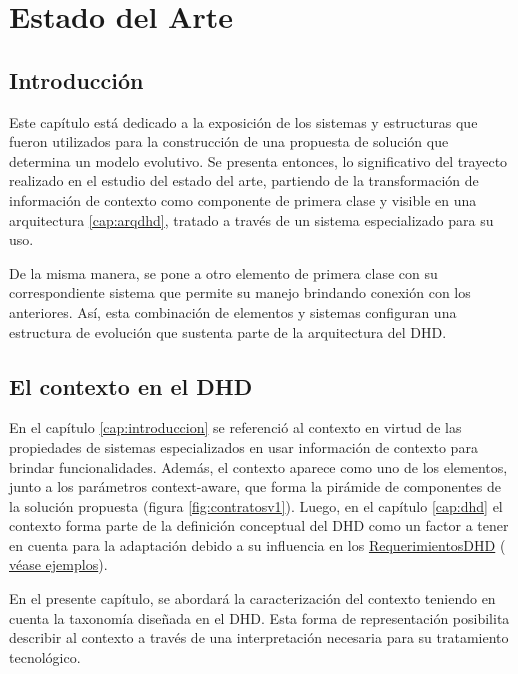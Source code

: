 \chapter{Estado del Arte} \label{cap:estadodelarte}


\section{Introducción}

Este capítulo está dedicado a la exposición de los sistemas y estructuras
que fueron utilizados para la construcción de una
propuesta de solución que determina un modelo evolutivo. Se
presenta entonces, lo significativo del trayecto  realizado en el estudio del estado del arte, partiendo de
la transformación de información de contexto como componente de primera
clase y visible en una arquitectura \ref{cap:arqdhd}, tratado a través de un
sistema especializado para su uso.


De la misma manera, se pone a otro elemento de primera clase con su
correspondiente sistema que permite su manejo brindando conexión con
los anteriores. Así, esta combinación de elementos y sistemas configuran una estructura
de evolución que sustenta parte de la arquitectura del DHD.


\section{El contexto en el DHD}

En el capítulo \ref{cap:introduccion} se referenció al contexto en
virtud de las propiedades de sistemas especializados en usar información
de contexto para brindar funcionalidades. Además, el contexto aparece como uno
de los elementos, junto a los parámetros context-aware, que forma la
pirámide
de componentes de la solución propuesta (figura \ref{fig:contratosv1}). Luego, en
el capítulo \ref{cap:dhd} el contexto forma parte de la definición conceptual
del DHD como un factor a tener en cuenta para la adaptación debido a su
influencia en los \hyperref[requerimientosdhd]{RequerimientosDHD} (
\hyperref[ejemplo1]{véase ejemplos}). 

En el presente capítulo, se abordará la caracterización del contexto teniendo en cuenta la taxonomía diseñada en el DHD.
Esta forma de representación posibilita describir al
contexto a través de una interpretación necesaria para su tratamiento tecnológico.


